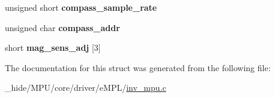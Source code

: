 \begin{DoxyCompactItemize}
\item 
\hypertarget{group___d_r_i_v_e_r_s_gaa09c90bbbb84534c3bf711cae228e726}{}unsigned short {\bfseries compass\+\_\+sample\+\_\+rate}\label{group___d_r_i_v_e_r_s_gaa09c90bbbb84534c3bf711cae228e726}

\item 
\hypertarget{group___d_r_i_v_e_r_s_gac45c262ce08c3a61e868cd15142f5b35}{}unsigned char {\bfseries compass\+\_\+addr}\label{group___d_r_i_v_e_r_s_gac45c262ce08c3a61e868cd15142f5b35}

\item 
\hypertarget{group___d_r_i_v_e_r_s_ga610fe7ee0ebe87f9c734b746ab6c3d2c}{}short {\bfseries mag\+\_\+sens\+\_\+adj} \mbox{[}3\mbox{]}\label{group___d_r_i_v_e_r_s_ga610fe7ee0ebe87f9c734b746ab6c3d2c}

\end{DoxyCompactItemize}


The documentation for this struct was generated from the following file\+:\begin{DoxyCompactItemize}
\item 
\+\_\+hide/\+M\+P\+U/core/driver/e\+M\+P\+L/\hyperlink{inv__mpu_8c}{inv\+\_\+mpu.\+c}\end{DoxyCompactItemize}
